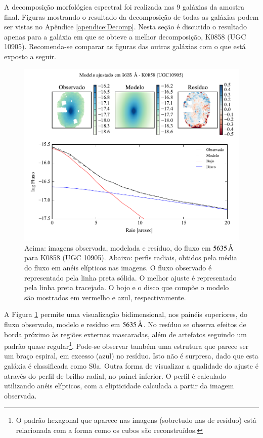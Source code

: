 A decomposição morfológica espectral foi realizada nas 9 galáxias da amostra
final. Figuras mostrando o resultado da decomposição de todas as galáxias podem
ser vistas no Apêndice \ref{apendice:Decomp}. Nesta seção é discutido o
resultado apenas para a galáxia em que se obteve a melhor decomposição, K0858
(UGC 10905). Recomenda-se comparar as figuras das outras galáxias com o que está
exposto a seguir.

\begin{figure}
	\includegraphics[page=1]{figuras-decomp/K0858_sample006a}
	\caption[Ajuste morfológico em $5635\,\angstrom$ para K0858 (UGC 10905)]
	{Acima: imagens observada, modelada e resíduo, do fluxo em $5635\,\angstrom$
	para K0858 (UGC 10905). Abaixo: perfis radiais, obtidos pela média do fluxo em
	anéis elípticos nas imagens. O fluxo observado é representado pela linha preta
	sólida. O melhor ajuste é representado pela linha preta tracejada. O bojo e o
	disco que compõe o modelo são mostrados em vermelho e azul, respectivamente.}
	\label{fig:decompRadprof}
\end{figure}

A Figura \ref{fig:decompRadprof} permite uma visualização bidimensional, nos
painéis superiores, do fluxo observado, modelo e resíduo em $5635\,\angstrom$.
No resíduo se observa efeitos de borda próximo às regiões externas mascaradas,
além de artefatos seguindo um padrão quase regular\footnote{O padrão hexagonal
que aparece nas imagens (sobretudo nas de resíduo) está relacionada com a forma
como os cubos são reconstruídos.}. Pode-se observar também uma estrutura que
parece ser um braço espiral, em excesso (azul) no resíduo. Isto não é surpresa,
dado que esta galáxia é classificada como S0a. Outra forma de visualizar a
qualidade do ajuste é através do perfil de brilho radial, no painel inferior. O
perfil é calculado utilizando anéis elípticos, com a elipticidade calculada a
partir da imagem observada.

